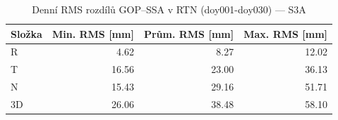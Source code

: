 \begin{table}[H]
\centering
\caption{Denní RMS rozdílů GOP–SSA v RTN (doy001-doy030) — S3A}
\label{tab:gop_vs_ssa_s3a_doy001-doy030_rms}
\begin{tabular}{lrrr}
\toprule
Složka & Min. RMS [mm] & Prům. RMS [mm] & Max. RMS [mm] \\
\midrule
R & 4.62 & 8.27 & 12.02 \\
T & 16.56 & 23.00 & 36.13 \\
N & 15.43 & 29.16 & 51.71 \\
3D & 26.06 & 38.48 & 58.10 \\
\bottomrule
\end{tabular}
\end{table}
